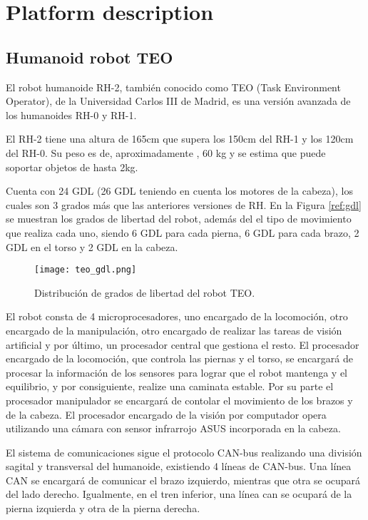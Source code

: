 
\chapter{Platform description}
\section{Humanoid robot TEO}
El robot humanoide RH-2, también conocido como TEO (Task Environment Operator), de la Universidad Carlos III de Madrid, es una versión avanzada de los humanoides RH-0 y RH-1. 

El RH-2 tiene una altura de 165cm que supera los 150cm del RH-1 y los 120cm del RH-0. Su peso es de, aproximadamente , 60 kg y se estima que puede soportar objetos de hasta 2kg.

Cuenta con 24 GDL (26 GDL teniendo en cuenta los motores de la cabeza), los cuales son 3 grados más que las anteriores versiones de RH. En la Figura \ref{ref:gdl} se muestran los grados de libertad del robot, además del el tipo de movimiento que realiza cada uno, siendo 6 GDL para cada pierna, 6 GDL para cada brazo, 2 GDL en el torso y 2 GDL en la cabeza.

\begin{figure}[!hbt]
\centering
\texttt{[image: teo\_gdl.png]}
\caption{Distribución de grados de libertad del robot TEO.}
\label{fig:gdl}
\end{figure}

El robot consta de 4 microprocesadores, uno encargado de la locomoción, otro encargado de la manipulación, otro encargado de realizar las tareas de visión artificial y por último, un procesador central que gestiona el resto. El procesador encargado de la locomoción, que controla las piernas y el torso, se encargará de procesar la información de los sensores para lograr que el robot mantenga y el equilibrio, y por consiguiente, realize una caminata estable. Por su parte el procesador manipulador se encargará de contolar el movimiento de los brazos y de la cabeza. El procesador encargado de la visión por computador opera utilizando una cámara con sensor infrarrojo ASUS incorporada en la cabeza.

El sistema de comunicaciones sigue el protocolo CAN-bus realizando una división sagital y transversal del humanoide, existiendo 4 líneas de CAN-bus. Una línea CAN se encargará de comunicar el brazo izquierdo, mientras que otra se ocupará del lado derecho. Igualmente, en el tren inferior, una línea can se ocupará de la pierna izquierda y otra de la pierna derecha.\\

